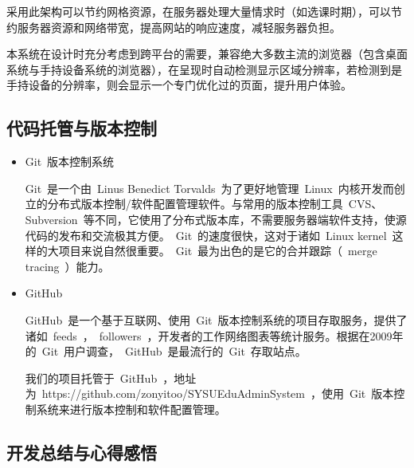 采用此架构可以节约网格资源，在服务器处理大量情求时（如选课时期），可以节约服务器资源和网络带宽，提高网站的响应速度，减轻服务器负担。

本系统在设计时充分考虑到跨平台的需要，兼容绝大多数主流的浏览器（包含桌面系统与手持设备系统的浏览器），在呈现时自动检测显示区域分辨率，若检测到是手持设备的分辨率，则会显示一个专门优化过的页面，提升用户体验。


\subsection{代码托管与版本控制}
\begin{itemize}
  \item Git~版本控制系统
  
  \CJKindent Git~是一个由~Linus Benedict Torvalds~为了更好地管理~Linux~内核开发而创立的分布式版本控制/软件配置管理软件。与常用的版本控制工具~CVS、Subversion~等不同，它使用了分布式版本库，不需要服务器端软件支持，使源代码的发布和交流极其方便。~Git~的速度很快，这对于诸如~Linux kernel~这样的大项目来说自然很重要。~Git~最为出色的是它的合并跟踪（~merge tracing~）能力。
  
  \item GitHub
  
  \CJKindent GitHub~是一个基于互联网、使用~Git~版本控制系统的项目存取服务，提供了诸如~feeds~，~followers~，开发者的工作网络图表等统计服务。根据在2009年的~Git~用户调查，~GitHub~是最流行的~Git~存取站点。
  
  \CJKindent 我们的项目托管于~GitHub~，地址为~https://github.com/zonyitoo/SYSUEduAdminSystem~，使用~Git~版本控制系统来进行版本控制和软件配置管理。
\end{itemize}

\newpage
\begin{center}
  \section{开发总结与心得感悟}
\end{center}

